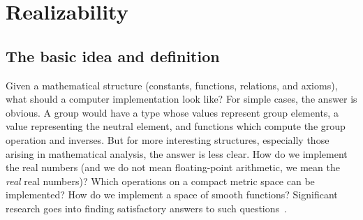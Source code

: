 \chapter{Realizability}
\label{chap:realizability}

\section{The basic idea and definition}
\label{sec:realizability-basic-idea}

Given a mathematical structure (constants, functions, relations, and
axioms), what should a computer implementation look like? For simple
cases, the answer is obvious. A group would have a type whose values
represent group elements, a value representing the neutral element,
and functions which compute the group operation and inverses. But for
more interesting structures, especially those arising in mathematical
analysis, the answer is less clear. How do we implement the real
numbers (and we do not mean floating-point arithmetic, we mean the
\emph{real} real numbers)? Which operations on a compact metric space
can be implemented? How do we implement a space of smooth functions?
Significant research goes into finding satisfactory answers to such
questions~\cite{Wei00,TZ98,Bla97}.

